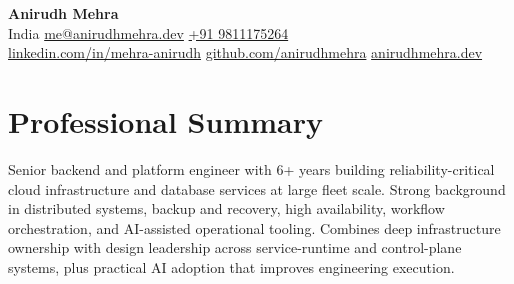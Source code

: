 \documentclass[10pt,letterpaper]{article}
\newcommand{\contactsep}{\hspace{0.45em}\textbar\hspace{0.45em}}
\begin{document}
\begin{center}
{\fontsize{22}{24}\selectfont\textbf{Anirudh Mehra}}\\[0.24em]
India \contactsep \href{mailto:me@anirudhmehra.dev}{me@anirudhmehra.dev} \contactsep \href{tel:+919811175264}{+91 9811175264}\\[0.12em]
\href{https://www.linkedin.com/in/mehra-anirudh/}{linkedin.com/in/mehra-anirudh} \contactsep \href{https://github.com/anirudhmehra}{github.com/anirudhmehra} \contactsep \href{https://www.anirudhmehra.dev}{anirudhmehra.dev}
\end{center}

\vspace{0.22em}

\section*{Professional Summary}
Senior backend and platform engineer with 6+ years building reliability-critical cloud infrastructure and database services at large fleet scale. Strong background in distributed systems, backup and recovery, high availability, workflow orchestration, and AI-assisted operational tooling. Combines deep infrastructure ownership with design leadership across service-runtime and control-plane systems, plus practical AI adoption that improves engineering execution.
\end{document}
